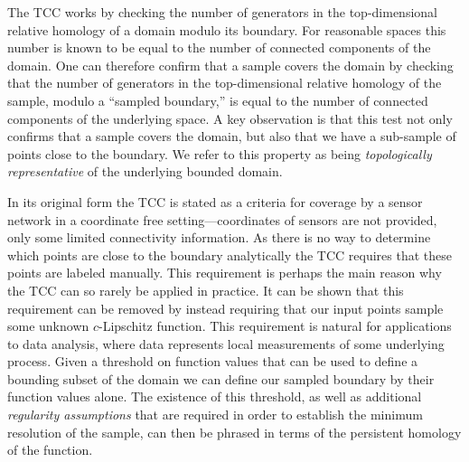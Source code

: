 
The TCC works by checking the number of generators in the top-dimensional relative homology of a domain modulo its boundary.
For reasonable spaces this number is known to be equal to the number of connected components of the domain.
One can therefore confirm that a sample covers the domain by checking that the number of generators in the top-dimensional relative homology of the sample, modulo a ``sampled boundary,'' is equal to the number of connected components of the underlying space.
A key observation is that this test not only confirms that a sample covers the domain, but also that we have a sub-sample of points close to the boundary.
We refer to this property as being \emph{topologically representative} of the underlying bounded domain.

In its original form the TCC is stated as a criteria for coverage by a sensor network in a coordinate free setting---coordinates of sensors are not provided, only some limited connectivity information.
As there is no way to determine which points are close to the boundary analytically the TCC requires that these points are labeled manually.
This requirement is perhaps the main reason why the TCC can so rarely be applied in practice.
It can be shown that this requirement can be removed by instead requiring that our input points sample some unknown $c$-Lipschitz function.
This requirement is natural for applications to data analysis, where data represents local measurements of some underlying process.
Given a threshold on function values that can be used to define a bounding subset of the domain we can define our sampled boundary by their function values alone.
The existence of this threshold, as well as additional \emph{regularity assumptions} that are required in order to establish the minimum resolution of the sample, can then be phrased in terms of the persistent homology of the function.


